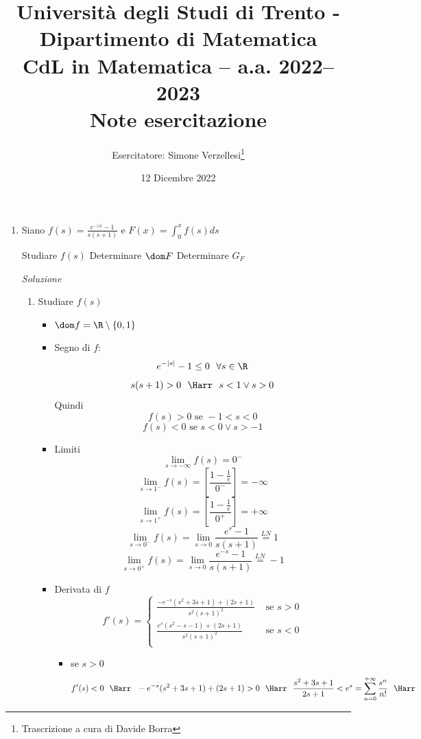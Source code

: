 \documentclass{article}
\title{Università degli Studi di Trento - Dipartimento di Matematica\\
CdL in Matematica – a.a. 2022–2023\\ Note esercitazione}
\author{Esercitatore: Simone Verzellesi\thanks{Trascrizione a cura di Davide Borra}}
\date{12 Dicembre 2022}
\newcommand{\se}{\text{ se }}
\begin{document}
\maketitle
{}
\setlength{\headheight}{30pt}
\begin{enumerate}[label=\textbf{Esercizio 12.\arabic*.},itemindent=*]
\item Siano $f(s)=\frac{e^{-|s|}-1}{s(s+1)}$ e $F(x)=\int_0^xf(s)ds$
\begin{tasks}
    \task Studiare $f(s)$
    \task Determinare $\dom F$
    \task Determinare $G_F$
\end{tasks}
\item[\textit{\large Soluzione~}]~
\begin{enumerate}
    \item Studiare $f(s)$
    \begin{itemize}
        \item $\dom f=\R\setminus\{0,1\}$
        \item Segno di $f$:
        \[e^{-|s|}-1\leq 0~~\forall s\in \R\]
        \[s(s+1)>0~~\Harr~~s<1\lor s>0\]
        Quindi
        \[f(s)>0 \se -1<s<0\]
        \[f(s)<0 \se s<0 \lor s>-1\]
        \item Limiti
        \[\lim_{s\to-\infty}f(s)=0^-\]
        \[\lim_{s\to1^-}f(s)=\left[ \frac{1-\frac{1}{e}}{0^-} \right]=-\infty\]
        \[\lim_{s\to1^+}f(s)=\left[ \frac{1-\frac{1}{e}}{0^+} \right]=+\infty\]
        \[\lim_{s\to0^-}f(s)=\lim_{s\to 0}\frac{e^s-1}{s(s+1)}\stackrel{LN}{=}1\]
        \[\lim_{s\to0^+}f(s)=\lim_{s\to 0}\frac{e^{-s}-1}{s(s+1)}\stackrel{LN}{=}-1\]
        \item Derivata di $f$
        \[f'(s)=\begin{cases}
            \frac{-e^{-s}(s^2+3s+1)+(2s+1)}{s^2(s+1)^2}&\se s>0\\
            \frac{e^{s}(s^2-s-1)+(2s+1)}{s^2(s+1)^2}&\se s<0\\
        \end{cases}\]
        \begin{itemize}
            \item se $s>0$
            \[f'(s)<0~~\Harr~~-e^{-s}(s^2+3s+1)+(2s+1)>0~~\Harr~~\frac{s^2+3s+1}{2s+1}<e^s=\sum_{n=0}^{+\infty}\frac{s^n}{n!}~~\Harr\]

\end{itemize}
\end{itemize}
\end{enumerate}
\end{enumerate}
\end{document}
